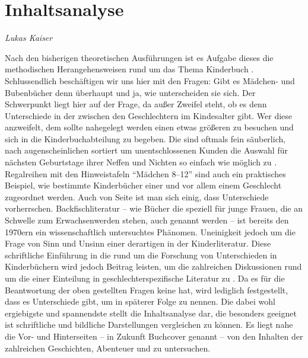 
\section{Inhaltsanalyse}     \emph{Lukas Kaiser}   \smallskip

  \noindent Nach den bisherigen theoretischen Ausführungen ist es Aufgabe dieses
  \Teilbereiches die methodischen Herangehensweisen rund um das Thema Kinderbuch
  \vorzustellen. Schlussendlich beschäftigen wir uns hier mit den
   Fragen: Gibt es Mädchen- und Bubenbücher denn überhaupt und
  \wenn ja, wie unterscheiden sie sich. Der Schwerpunkt liegt hier auf der
  \zweiten Frage, da außer Zweifel steht, ob es denn Unterschiede in der
   zwischen den Geschlechtern im Kindesalter gibt. Wer diese
  \Tatsache anzweifelt, dem sollte nahegelegt werden einen etwas größeren
  \Buchladen zu besuchen und sich in die Kinderbuchabteilung zu begeben. Die
   sind oftmals fein säuberlich, nach augenscheinlichen
   sortiert um unentschlossenen Kunden die Auswahl für
  \die nächsten Geburtstage ihrer Neffen und Nichten so einfach wie möglich zu
  \gestalten. Regalreihen mit den Hinweistafeln \enquote{Mädchen 8--12} sind
  \wohl auch ein praktisches Beispiel, wie bestimmte Kinderbücher einer
  \Altersgruppe und vor allem einem Geschlecht zugeordnet werden. Auch von
  \wissenschaftlicher Seite ist man sich einig, dass Unterschiede vorherrschen.
  \Die Backfischliteratur -- wie Bücher die speziell für junge Frauen, die an
  \der Schwelle zum Erwachsenwerden stehen, auch genannt werden -- ist bereits
  \seit den 1970ern ein wissenschaftlich untersuchtes Phänomen. Uneinigkeit
  \herrscht jedoch um die Frage von Sinn und Unsinn einer derartigen
  \Zweigleisigkeit in der Kinderliteratur. Diese schriftliche Einführung in die
  \Methodik rund um die Forschung von Unterschieden in Kinderbüchern wird jedoch
  \keinen Beitrag leisten, um die zahlreichen Diskussionen rund um die
  \Sinnhaftigkeit einer Einteilung in geschlechterspezifische Literatur zu
  . Da es für die Beantwortung der oben gestellten Fragen keine
  \Relevanz hat, wird lediglich festgestellt, dass es Unterschiede gibt, um
  \diese in späterer Folge zu nennen. Die dabei wohl ergiebigste und spannendste
  \Forschungsmethode stellt die Inhaltsanalyse dar, die besonders geeignet ist
  \um schriftliche und bildliche Darstellungen vergleichen zu können. Es liegt
  \daher nahe die Vor- und Hinterseiten -- in Zukunft Buchcover genannt --
  \gesondert von den Inhalten der zahlreichen Geschichten, Abenteuer und
   zu untersuchen.

